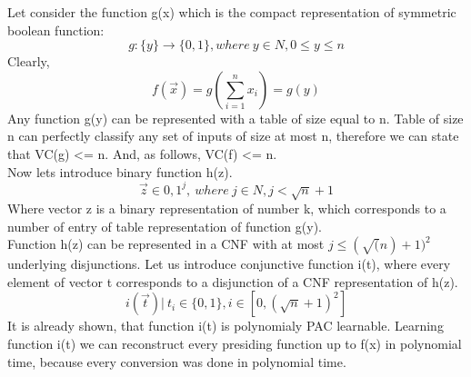 Let consider the function g(x) which is the compact representation of symmetric boolean function:
\[
g:\{y\} \to \{0, 1\},where \ y\in N, 0 \leq y \leq n
\]
Clearly,
\[
f(\vec x) = g(\sum\limits_{i=1}^n x_i)=g(y)
\]
Any function g(y) can be represented with a table of size equal to n.
Table of size n can perfectly classify any set of inputs of size at most n, therefore we can state that VC(g) <= n. And, as follows, VC(f) <= n.
\[
\]
Now lets introduce binary function h(z).
\[
\vec z \in {0, 1}^j, \ where \ j \in N, j < \sqrt n +1
\]
Where vector z is a binary representation of number k, which corresponds to a number of entry of table representation of function g(y).
\[
\]
Function h(z) can be represented in a CNF with at most $j\leq(\sqrt(n)+1)^2$ underlying disjunctions. Let us introduce conjunctive function i(t), where every element of vector t corresponds to a disjunction of a CNF representation of h(z). 
\[
i(\vec t)| \ t_i \in \{0, 1\}, i \in [0, (\sqrt n+1)^2]
\]
It is already shown, that function i(t) is polynomialy PAC learnable. Learning function i(t) we can reconstruct every presiding function up to f(x) in polynomial time, because every conversion was done in polynomial time.